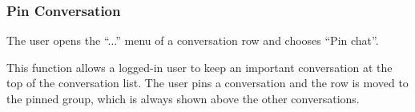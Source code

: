 
\subsubsection{Pin Conversation}

 The user opens the ``...'' menu of a conversation row and chooses ``Pin chat''.

 This function allows a logged-in user to keep an important conversation at the top of the conversation list. The user pins a conversation and the row is moved to the pinned group, which is always shown above the other conversations.



